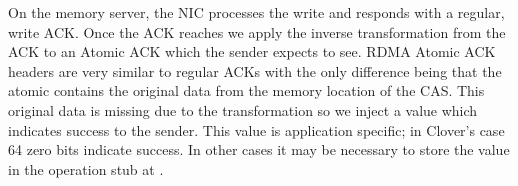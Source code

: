 On the memory server, the NIC processes the write and responds with a
regular, write ACK. Once the ACK reaches {\sword} we apply the
inverse transformation from the ACK to an Atomic ACK which the sender
expects to see.  RDMA Atomic ACK headers are very similar to regular
ACKs with the only difference being that the atomic contains the
original data from the memory location of the CAS. This original data
is missing due to the transformation so we inject a value which
indicates success to the sender.
This value is application specific; in Clover's case 64 zero bits
indicate success.  In other cases it may be necessary to store the
value in the operation stub at {\sword}.



